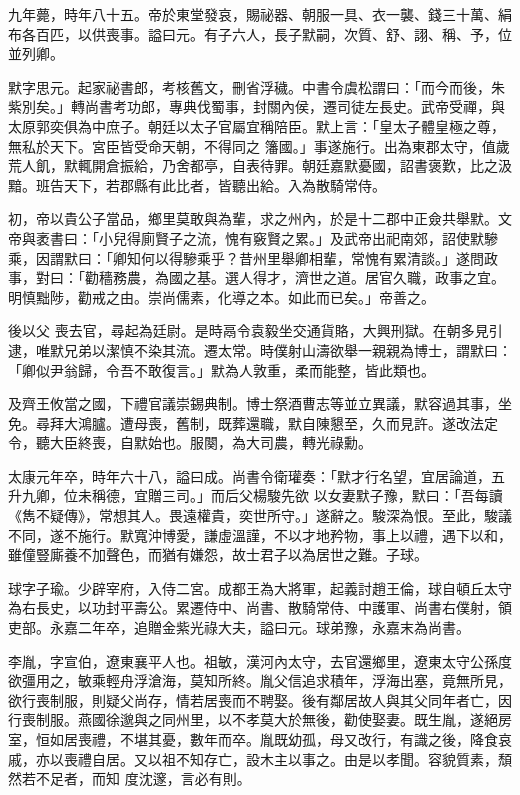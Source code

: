 \begin{pinyinscope}
 九年薨，時年八十五。帝於東堂發哀，賜祕器、朝服一具、衣一襲、錢三十萬、絹布各百匹，以供喪事。謚曰元。有子六人，長子默嗣，次質、舒、詡、稱、予，位並列卿。



 默字思元。起家祕書郎，考核舊文，刪省浮穢。中書令虞松謂曰：「而今而後，朱紫別矣。」轉尚書考功郎，專典伐蜀事，封關內侯，遷司徒左長史。武帝受禪，與太原郭奕俱為中庶子。朝廷以太子官屬宜稱陪臣。默上言：「皇太子體皇極之尊，無私於天下。宮臣皆受命天朝，不得同之
 籓國。」事遂施行。出為東郡太守，值歲荒人飢，默輒開倉振給，乃舍都亭，自表待罪。朝廷嘉默憂國，詔書褒歎，比之汲黯。班告天下，若郡縣有此比者，皆聽出給。入為散騎常侍。



 初，帝以貴公子當品，鄉里莫敢與為輩，求之州內，於是十二郡中正僉共舉默。文帝與袤書曰：「小兒得廁賢子之流，愧有竅賢之累。」及武帝出祀南郊，詔使默驂乘，因謂默曰：「卿知何以得驂乘乎？昔州里舉卿相輩，常愧有累清談。」遂問政事，對曰：「勸穡務農，為國之基。選人得才，濟世之道。居官久職，政事之宜。明慎黜陟，勸戒之由。崇尚儒素，化導之本。如此而已矣。」帝善之。



 後以父
 喪去官，尋起為廷尉。是時鬲令袁毅坐交通貨賂，大興刑獄。在朝多見引逮，唯默兄弟以潔慎不染其流。遷太常。時僕射山濤欲舉一親親為博士，謂默曰：「卿似尹翁歸，令吾不敢復言。」默為人敦重，柔而能整，皆此類也。



 及齊王攸當之國，下禮官議崇錫典制。博士祭酒曹志等並立異議，默容過其事，坐免。尋拜大鴻臚。遭母喪，舊制，既葬還職，默自陳懇至，久而見許。遂改法定令，聽大臣終喪，自默始也。服闋，為大司農，轉光祿勳。



 太康元年卒，時年六十八，謚曰成。尚書令衛瓘奏：「默才行名望，宜居論道，五升九卿，位未稱德，宜贈三司。」而后父楊駿先欲
 以女妻默子豫，默曰：「吾每讀《雋不疑傳》，常想其人。畏遠權貴，奕世所守。」遂辭之。駿深為恨。至此，駿議不同，遂不施行。默寬沖博愛，謙虛溫謹，不以才地矜物，事上以禮，遇下以和，雖僮豎廝養不加聲色，而猶有嫌怨，故士君子以為居世之難。子球。



 球字子瑜。少辟宰府，入侍二宮。成都王為大將軍，起義討趙王倫，球自頓丘太守為右長史，以功封平壽公。累遷侍中、尚書、散騎常侍、中護軍、尚書右僕射，領吏部。永嘉二年卒，追贈金紫光祿大夫，謚曰元。球弟豫，永嘉末為尚書。



 李胤，字宣伯，遼東襄平人也。祖敏，漢河內太守，去官還鄉里，遼東太守公孫度欲彊用之，敏乘輕舟浮滄海，莫知所終。胤父信追求積年，浮海出塞，竟無所見，欲行喪制服，則疑父尚存，情若居喪而不聘娶。後有鄰居故人與其父同年者亡，因行喪制服。燕國徐邈與之同州里，以不孝莫大於無後，勸使娶妻。既生胤，遂絕房室，恒如居喪禮，不堪其憂，數年而卒。胤既幼孤，母又改行，有識之後，降食哀戚，亦以喪禮自居。又以祖不知存亡，設木主以事之。由是以孝聞。容貌質素，頹然若不足者，而知
 度沈邃，言必有則。




\end{pinyinscope}
